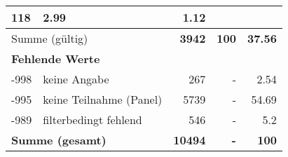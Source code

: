 \begin{longtable}{lXrrr}
       \num{118} &
       \num[round-mode=places,round-precision=2]{2.99} &
         \num[round-mode=places,round-precision=2]{1.12} \\
     \midrule
     \multicolumn{2}{l}{Summe (gültig)} &
       \textbf{\num{3942}} &
     \textbf{\num{100}} &
       \textbf{\num[round-mode=places,round-precision=2]{37.56}} \\
     \multicolumn{5}{l}{\textbf{Fehlende Werte}}\\
       -998 &
       keine Angabe &
         \num{267} &
        - &
         \num[round-mode=places,round-precision=2]{2.54} \\
       -995 &
       keine Teilnahme (Panel) &
         \num{5739} &
        - &
         \num[round-mode=places,round-precision=2]{54.69} \\
       -989 &
       filterbedingt fehlend &
         \num{546} &
        - &
         \num[round-mode=places,round-precision=2]{5.2} \\
     \midrule
     \multicolumn{2}{l}{\textbf{Summe (gesamt)}} &
          \textbf{\num{10494}} &
        \textbf{-} &
        \textbf{\num{100}} \\
     \bottomrule
     \end{longtable}
     
